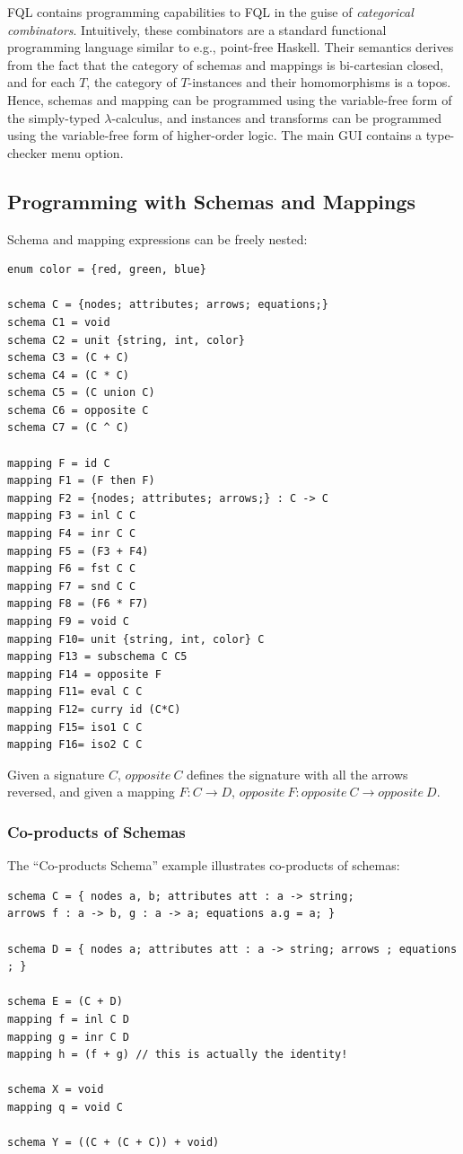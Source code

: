 \documentclass[12pt]{article}
\begin{document}
FQL contains programming capabilities to FQL in the guise of {\it categorical combinators}.  Intuitively, these combinators are a standard functional programming language similar to e.g., point-free Haskell. Their semantics derives from the fact that the category of schemas and mappings is bi-cartesian closed, and for each $T$, the category of $T$-instances and their homomorphisms is a topos.  Hence, schemas and mapping can be programmed using the variable-free form of the simply-typed $\lambda$-calculus, and instances and transforms can be programmed using the variable-free form of higher-order logic.   The main GUI contains a type-checker menu option.

\subsection{Programming with Schemas and Mappings}
Schema and mapping expressions can be freely nested:
\begin{verbatim}
enum color = {red, green, blue}

schema C = {nodes; attributes; arrows; equations;}
schema C1 = void
schema C2 = unit {string, int, color}
schema C3 = (C + C)
schema C4 = (C * C)
schema C5 = (C union C)
schema C6 = opposite C
schema C7 = (C ^ C)

mapping F = id C
mapping F1 = (F then F)
mapping F2 = {nodes; attributes; arrows;} : C -> C
mapping F3 = inl C C
mapping F4 = inr C C
mapping F5 = (F3 + F4)
mapping F6 = fst C C
mapping F7 = snd C C
mapping F8 = (F6 * F7)
mapping F9 = void C
mapping F10= unit {string, int, color} C
mapping F13 = subschema C C5
mapping F14 = opposite F
mapping F11= eval C C
mapping F12= curry id (C*C)
mapping F15= iso1 C C
mapping F16= iso2 C C
\end{verbatim}
Given a signature $C$, $opposite \ C$ defines the signature with all the arrows reversed, and given a mapping $F : C \to D$, $opposite \ F : opposite \ C \to opposite \ D$.

\subsubsection{Co-products of Schemas}

The ``Co-products Schema'' example illustrates co-products of schemas:

\begin{verbatim}
schema C = { nodes a, b; attributes att : a -> string; 
arrows f : a -> b, g : a -> a; equations a.g = a; }

schema D = { nodes a; attributes att : a -> string; arrows ; equations ; }

schema E = (C + D)
mapping f = inl C D
mapping g = inr C D
mapping h = (f + g) // this is actually the identity!

schema X = void
mapping q = void C

schema Y = ((C + (C + C)) + void)
\end{verbatim}
\end{document}
